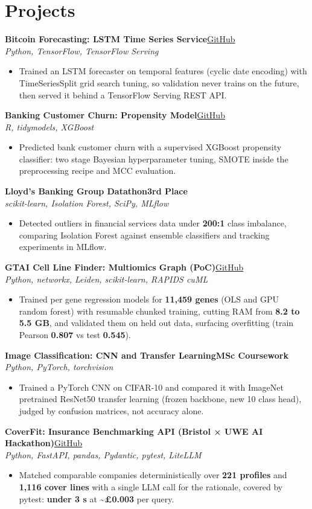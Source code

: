 \documentclass[a4paper,11pt]{article}
\newcommand{\project}[3]{\textbf{#1}\hfill#3\\
  {\color{muted}\small\textit{#2}}\par}
\newcommand{\gh}[1]{\href{#1}{\small GitHub}}
\newcommand{\badge}[1]{{\color{navy}\small\textbf{#1}}}
\newcommand{\gap}{\vspace{5pt}}
\newcommand{\num}[1]{\textbf{#1}}
\begin{document}
\section{Projects}
\project{Bitcoin Forecasting: LSTM Time Series Service}{Python, TensorFlow, TensorFlow Serving}{\gh{https://github.com/Thiruvel-AP/BitcoinForecasting}}
\begin{itemize}
  \item Trained an LSTM forecaster on temporal features (cyclic date encoding) with TimeSeriesSplit grid search tuning, so validation never trains on the future, then served it behind a TensorFlow Serving REST API.
\end{itemize}
\gap
\project{Banking Customer Churn: Propensity Model}{R, tidymodels, XGBoost}{\gh{https://github.com/Thiruvel-AP/Banking-Customer-Churn-Prediction}}
\begin{itemize}
  \item Predicted bank customer churn with a supervised XGBoost propensity classifier: two stage Bayesian hyperparameter tuning, SMOTE inside the preprocessing recipe and MCC evaluation.
\end{itemize}
\gap
\project{Lloyd's Banking Group Datathon}{scikit-learn, Isolation Forest, SciPy, MLflow}{\badge{3rd Place}}
\begin{itemize}
  \item Detected outliers in financial services data under \num{200:1} class imbalance, comparing Isolation Forest against ensemble classifiers and tracking experiments in MLflow.
\end{itemize}
\gap
\project{GTAI Cell Line Finder: Multiomics Graph (PoC)}{Python, networkx, Leiden, scikit-learn, RAPIDS cuML}{\gh{https://github.com/Thiruvel-AP/GTAI-GraphPOC}}
\begin{itemize}
  \item Trained per gene regression models for \num{11,459 genes} (OLS and GPU random forest) with resumable chunked training, cutting RAM from \num{8.2 to 5.5 GB}, and validated them on held out data, surfacing overfitting (train Pearson \num{0.807} vs test \num{0.545}).
\end{itemize}
\gap
\project{Image Classification: CNN and Transfer Learning}{Python, PyTorch, torchvision}{\badge{MSc Coursework}}
\begin{itemize}
  \item Trained a PyTorch CNN on CIFAR-10 and compared it with ImageNet pretrained ResNet50 transfer learning (frozen backbone, new 10 class head), judged by confusion matrices, not accuracy alone.
\end{itemize}
\gap
\project{CoverFit: Insurance Benchmarking API (Bristol × UWE AI Hackathon)}{Python, FastAPI, pandas, Pydantic, pytest, LiteLLM}{\gh{https://github.com/Thiruvel-AP/AIHackathon-Phoenix}}
\begin{itemize}
  \item Matched comparable companies deterministically over \num{221 profiles} and \num{1,116 cover lines} with a single LLM call for the rationale, covered by pytest: \num{under 3 s} at \num{\textasciitilde£0.003} per query.
\end{itemize}
\end{document}

